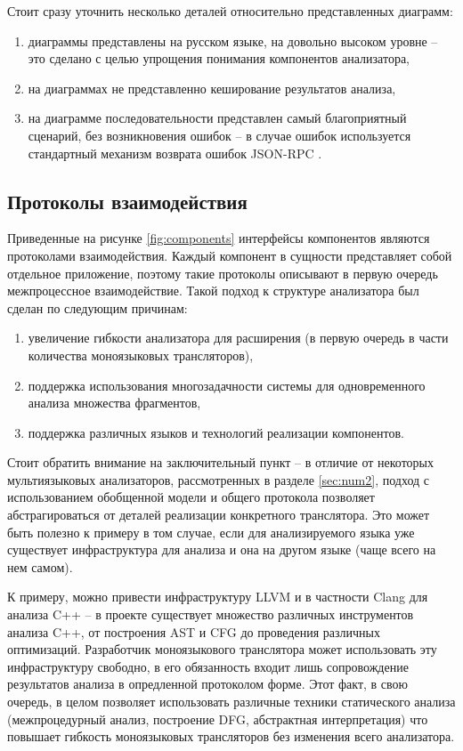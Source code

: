 Стоит сразу уточнить несколько деталей относительно представленных диаграмм:
\begin{enumerate}[1)]
    \item диаграммы представлены на русском языке, на довольно высоком уровне -- это сделано с целью упрощения
    понимания компонентов анализатора,
    \item на диаграммах не представленно кеширование результатов анализа,
    \item на диаграмме последовательности представлен самый благоприятный сценарий, без возникновения ошибок -- в случае ошибок
    используется стандартный механизм возврата ошибок JSON-RPC \cite{JSON-RPC}.
\end{enumerate}

\subsection{Протоколы взаимодействия}

Приведенные на рисунке \ref{fig:components} интерфейсы компонентов являются протоколами взаимодействия.
Каждый компонент в сущности представляет собой отдельное приложение, поэтому такие протоколы описывают в первую очередь межпроцессное взаимодействие.
Такой подход к структуре анализатора был сделан по следующим причинам:
\begin{enumerate}[1)]
    \item увеличение гибкости анализатора для расширения (в первую очередь в части количества моноязыковых трансляторов),
    \item поддержка использования многозадачности системы для одновременного анализа множества фрагментов,
    \item поддержка различных языков и технологий реализации компонентов.
\end{enumerate}

Стоит обратить внимание на заключительный пункт -- в отличие от некоторых мультиязыковых анализаторов, рассмотренных в разделе \ref{sec:num2},
подход с использованием обобщенной модели и общего протокола позволяет абстрагироваться от деталей реализации конкретного транслятора.
Это может быть полезно к примеру в том случае, если для анализируемого языка уже существует инфраструктура для анализа и она на другом языке
(чаще всего на нем самом). 

К примеру, можно привести инфраструктуру LLVM и в частности Clang для анализа C++ --
в проекте существует множество различных инструментов анализа C++, от построения AST и CFG до проведения различных оптимизаций.
Разработчик моноязыкового транслятора может использовать эту инфраструктуру свободно, в его обязанность входит лишь
сопровождение результатов анализа в опредленной протоколом форме.
Этот факт, в свою очередь, в целом позволяет использовать различные техники статического анализа (межпроцедурный анализ, построение DFG,
абстрактная интерпретация) что повышает гибкость моноязыковых трансляторов без изменения всего анализатора. 


